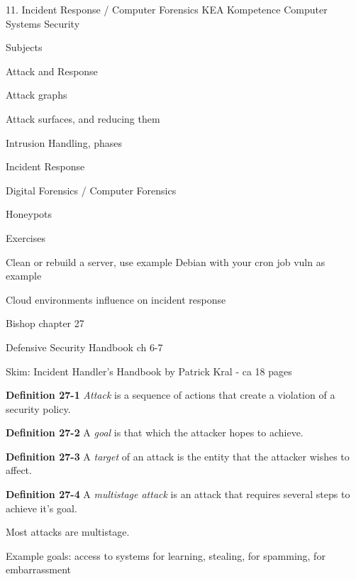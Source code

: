 \documentclass[Screen16to9,17pt]{foils}
\begin{document}
\mytitlepage
{11. Incident Response / Computer Forensics}
{KEA Kompetence Computer Systems Security \the\year}



\begin{list1}
\item Subjects
\begin{list2}
\item Attack and Response
\item Attack graphs
\item Attack surfaces, and reducing them
\item Intrusion Handling, phases
\item Incident Response
\item Digital Forensics / Computer Forensics
\item Honeypots
\end{list2}
\item Exercises
\begin{list2}
\item Clean or rebuild a server, use example Debian with your cron job vuln as example

\item Cloud environments influence on incident response
\end{list2}
\end{list1}




\begin{list1}
\item Bishop chapter 27
\item Defensive Security Handbook ch 6-7
\item Skim: Incident Handler's Handbook by Patrick Kral  - ca 18 pages
\end{list1}



\begin{list1}
\item {\bf Definition 27-1} \emph{Attack} is a sequence of actions that create a violation of a security policy.
\item {\bf Definition 27-2} A \emph{goal} is that which the attacker hopes to achieve.
\item {\bf Definition 27-3} A \emph{target} of an attack is the entity that the attacker wishes to affect.
\item {\bf Definition 27-4} A \emph{multistage attack} is an attack that requires several steps to achieve it's goal.
\item Most attacks are multistage.
\item Example goals: access to systems for learning, stealing,  for spamming, for embarrassment
\end{list1}
\end{document}
